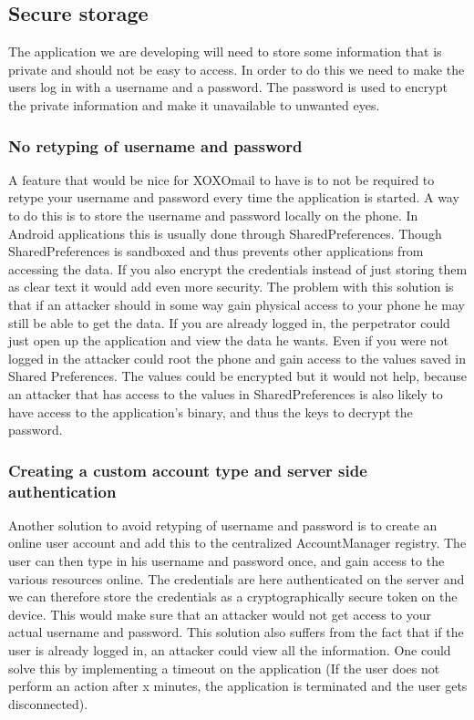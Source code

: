 \subsection{Secure storage}
The application we are developing will need to store some information that is private and should not be easy to access. In order to do this we need to make the users log in with a username and a password. The password is used to encrypt the private information and make it unavailable to unwanted eyes.  

\subsubsection{No retyping of username and password}
A feature that would be nice for XOXOmail to have is to not be required to retype your username and password every time the application is started.
\newline
\newline
A way to do this is to store the username and password locally on the phone. In Android applications this is usually done through SharedPreferences. Though SharedPreferences is sandboxed and thus prevents other applications from accessing the data. If you also encrypt the credentials instead of just storing them as clear text it would add even more security.
\newline
\newline
The problem with this solution is that if an attacker should in some way gain physical access to your phone he may still be able to get the data. If you are already logged in, the perpetrator could just open up the application and view the data he wants. Even if you were not logged in the attacker could root the phone and gain access to the values saved in Shared Preferences. The values could be encrypted but it would not help, because an attacker that has access to the values in SharedPreferences is also likely to have access to the application’s binary, and thus the keys to decrypt the password.


\subsubsection{Creating a custom account type and server side authentication}
Another solution to avoid retyping of username and password is to create an online user account and add this to the centralized AccountManager registry. The user can then type in his username and password once, and gain access to the various resources online. The credentials are here authenticated on the server and we can therefore store the credentials as a cryptographically secure token on the device. This would make sure that an attacker would not get access to your actual username and password.
\newline
\newline
This solution also suffers from the fact that if the user is already logged in, an attacker could view all the information. One could solve this by implementing a timeout on the application (If the user does not perform an action after x minutes, the application is terminated and the user gets disconnected).

